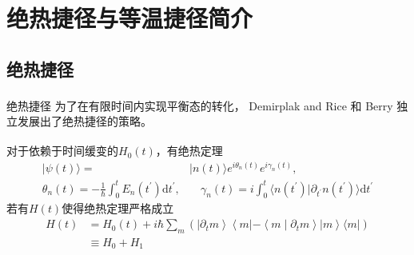 \documentclass{beamer}
\newcommand{\upcite}[1]{\textsuperscript{\cite{#1}}}  %
\newcommand{\M}[1]{\mathrm{#1}}
\begin{document}
\section{绝热捷径与等温捷径简介}
\subsection{绝热捷径}
\begin{frame}{绝热捷径}
为了在有限时间内实现平衡态的转化， Demirplak and Rice \upcite{Demirplak2003}和 Berry \upcite{Berry2009} 独立发展出了绝热捷径的策略。
\pause

对于依赖于时间缓变的$H_0(t)$，有绝热定理\upcite{Griffiths2018}
\begin{equation}
\begin{split}
    |\psi(t)\rangle=&|n(t)\rangle e^{i \theta_{n}(t)} e^{i \gamma_{n}(t)},\\
    \theta_{n}(t)=-\frac{1}{\hbar} \int_{0}^{t} E_{n}(t^{\prime}) \M{d} t^{\prime},& \quad \gamma_{n}(t)=i \int_{0}^{t}\langle n(t^{\prime}) | \partial_{t^{\prime}}n(t^{\prime})\rangle \M{d} t^{\prime}            
\end{split}        
    \label{eq9}
\end{equation}
\pause
若有$H(t)$使得绝热定理严格成立
\pause
\begin{equation}
\begin{split}
    H(t)&=H_{0}(t)+i \hbar \sum_{m}\left(\left|\partial_{t} m\right\rangle\left\langle m\left|-\left\langle m \mid \partial_{t} m\right\rangle\right| m\right\rangle\langle m|\right) \\
    &\equiv H_0 + H_1
\end{split}
    \label{eq10}
\end{equation}
\end{frame}
\end{document}
